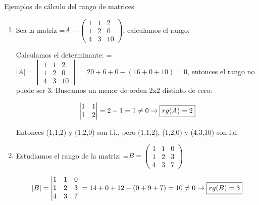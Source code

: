 \documentclass[11pt,a4paper]{article}
\newcommand{\fmm}[1]{\setbox0=\hbox{$#1$}\ifdim\wd0>\linewidth\fmdisp{#1}\else\mbox{\box0}\fi}
\newcommand{\fmdisp}[1]{\[\setbox2=\hbox{$\displaystyle #1$}\ifdim\wd2>\linewidth\resizebox{\linewidth}{!}{\box2}\else\box2\fi\]}
\begin{document}
\begin{fmex}{Ejemplos de cálculo del rango de matrices}
\begin{enumerate}[label=\textbf{\arabic*.},leftmargin=*]
Al ser cero todos ellos, se deduce que \textbf{la tercera fila es combinación lineal de las dos primeras.}

(Si alguno de estos tres menores fuera no nulo, la tercera fila sería l.i. de las dos primeras. Tomaríamos como base ese menor de orden 3 y ampliaríamos las tres columnas con los elementos correspondientes de la cuarta fila. Obtendríamos así tres columnas de cuatro elementos. Añadiendo otra columna, probaríamos si alguno de los menores de orden 4 era no nulo.)

Ahora haremos con la cuarta fila lo mismo que hemos hecho con la tercera. Los tres menores de orden 3 que así se obtienen son cero. Por tanto, \textbf{la cuarta fila es, también, combinación lineal de las dos primeras.}

El rango de la matriz es dos (máximo orden de un menor no nulo o, lo que es lo mismo, máximo número de filas l.i.). Entonces \fmm{\boxed{rg(A)=2}}.
\item Sea la matriz \fmm{A=\begin{pmatrix}1 & 1 & 2\\ 1 & 2 & 0\\ 4 & 3 & 10\end{pmatrix}}, calculamos el rango:

Calculamos el determinante: \fmm{|A|=\begin{vmatrix}1 & 1 & 2\\ 1 & 2 & 0\\ 4 & 3 & 10\end{vmatrix}=20+6+0-(16+0+10)=0}, entonces el rango no puede ser 3. Buscamos un menor de orden 2x2 distinto de cero:

\fmdisp{\begin{vmatrix}1 & 1\\ 1 & 2\end{vmatrix}=2-1=1\neq0\rightarrow\boxed{rg(A)=2}}

Entonces (1,1,2) y (1,2,0) son l.i., pero (1,1,2), (1,2,0) y (4,3,10) son l.d.
\item Estudiamos el rango de la matriz: \fmm{B=\begin{pmatrix}1 & 1 & 0\\ 1 & 2 & 3\\ 4 & 3 & 7\end{pmatrix}}

\fmdisp{|B|=\begin{vmatrix}1 & 1 & 0\\ 1 & 2 & 3\\ 4 & 3 & 7\end{vmatrix}=14+0+12-(0+9+7)=10\neq0\rightarrow\boxed{rg(B)=3}}


\end{enumerate}
\end{fmex}
\end{document}
